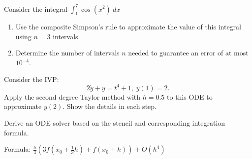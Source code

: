 \documentclass{eh-homework}
\begin{document}
    \begin{question}{3}
        Consider the integral \(\int _1^7 \cos (x^2)\ dx\)
        \begin{enumerate}[label=(\alph*)]
            \item Use the composite Simpson's rule to approximate the value of this integral using \(n=3\) intervals.
            
            \item Determine the number of intervals \(n\) needed to guarantee an error of at most \(10^{-4}\).
        \end{enumerate}
    \end{question}
    \begin{question}{4}
        Consider the IVP:
        \[
            2\dot y + y = t^4 + 1,\ y(1) = 2.
        \]
        Apply the second degree Taylor method with \(h = 0.5\) to this ODE to approximate \(y(2)\). Show the details in each step.
    \end{question}
    \begin{question}{5}
        Derive an ODE solver based on the stencil and corresponding integration formula.

        Formula: \(\frac{h}{4}\left( 3f \left( x_0 + \frac{1}{3}h \right) + f(x_0 + h) \right) + O (h^4)\) 
    \end{question}
\end{document}
